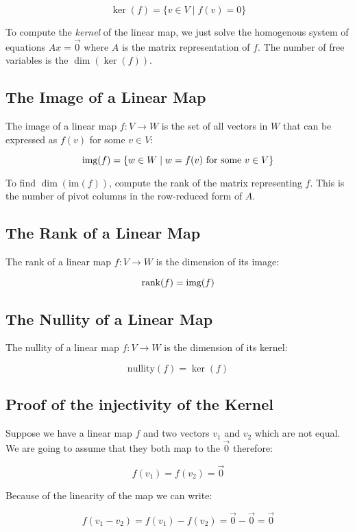 \[
    \ker(f) = \{ v \in V \mid f(v) = 0 \}
\]

To compute the \emph{kernel} of the linear map, we just solve the homogenous system of equations \(Ax = \vec{0}\) 
where \(A\) is the matrix representation of \(f\). The number of free variables is the \(\dim(\ker(f))\).

\subsection{The Image of a Linear Map}

The image of a linear map \( f: V \to W \) is the set of all vectors in \( W \) that can be expressed 
as \( f(v) \) for some \( v \in V \):

\[
    \text{img}(f) = \{ w \in W \mid w = f(v) \text{ for some } v \in V \}
\]

To find \( \dim(\text{im}(f)) \), compute the rank of the matrix representing \( f \). This 
is the number of pivot columns in the row-reduced form of \( A \).

\subsection{The Rank of a Linear Map}

The rank of a linear map \( f: V \to W \) is the dimension of its image:

\[
    \text{rank}(f) = \text{img}(f)
\]

\subsection{The Nullity of a Linear Map}

The nullity of a linear map \( f: V \to W \) is the dimension of its kernel:
    
\[
    \text{nullity}(f) = \ker(f)
\]

\subsection{Proof of the injectivity of the Kernel}

Suppose we have a linear map \(f\) and two vectors \(v_1\) and \(v_2\) which are not equal. 
We are going to assume that they both map to the \(\vec{0}\) therefore:

\[
    f(v_1) = f(v_2) = \vec{0}
\]

Because of the linearity of the map we can write:

\[
    f(v_1 - v_2) = f(v_1) - f(v_2) = \vec{0} - \vec{0} = \vec{0}
\]

